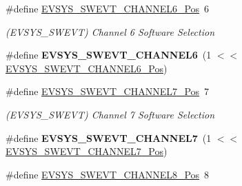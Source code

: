 \begin{DoxyCompactItemize}
\item 
\hypertarget{group___s_a_m_l21___e_v_s_y_s_ga923930945122e66f2e3a5734f2a1a4b7}{}\#define \hyperlink{group___s_a_m_l21___e_v_s_y_s_ga923930945122e66f2e3a5734f2a1a4b7}{E\+V\+S\+Y\+S\+\_\+\+S\+W\+E\+V\+T\+\_\+\+C\+H\+A\+N\+N\+E\+L6\+\_\+\+Pos}~6\label{group___s_a_m_l21___e_v_s_y_s_ga923930945122e66f2e3a5734f2a1a4b7}

\begin{DoxyCompactList}\small\item\em (E\+V\+S\+Y\+S\+\_\+\+S\+W\+E\+V\+T) Channel 6 Software Selection \end{DoxyCompactList}\item 
\hypertarget{group___s_a_m_l21___e_v_s_y_s_ga1cc70342b9a68bf2a9aaa671c36eea9c}{}\#define {\bfseries E\+V\+S\+Y\+S\+\_\+\+S\+W\+E\+V\+T\+\_\+\+C\+H\+A\+N\+N\+E\+L6}~(1 $<$$<$ \hyperlink{group___s_a_m_l21___e_v_s_y_s_ga923930945122e66f2e3a5734f2a1a4b7}{E\+V\+S\+Y\+S\+\_\+\+S\+W\+E\+V\+T\+\_\+\+C\+H\+A\+N\+N\+E\+L6\+\_\+\+Pos})\label{group___s_a_m_l21___e_v_s_y_s_ga1cc70342b9a68bf2a9aaa671c36eea9c}

\item 
\hypertarget{group___s_a_m_l21___e_v_s_y_s_ga4618f702d0e3ee1f6b10198b9acbf9af}{}\#define \hyperlink{group___s_a_m_l21___e_v_s_y_s_ga4618f702d0e3ee1f6b10198b9acbf9af}{E\+V\+S\+Y\+S\+\_\+\+S\+W\+E\+V\+T\+\_\+\+C\+H\+A\+N\+N\+E\+L7\+\_\+\+Pos}~7\label{group___s_a_m_l21___e_v_s_y_s_ga4618f702d0e3ee1f6b10198b9acbf9af}

\begin{DoxyCompactList}\small\item\em (E\+V\+S\+Y\+S\+\_\+\+S\+W\+E\+V\+T) Channel 7 Software Selection \end{DoxyCompactList}\item 
\hypertarget{group___s_a_m_l21___e_v_s_y_s_ga4b8e4ca4d7fd207d9140927a25f13bfa}{}\#define {\bfseries E\+V\+S\+Y\+S\+\_\+\+S\+W\+E\+V\+T\+\_\+\+C\+H\+A\+N\+N\+E\+L7}~(1 $<$$<$ \hyperlink{group___s_a_m_l21___e_v_s_y_s_ga4618f702d0e3ee1f6b10198b9acbf9af}{E\+V\+S\+Y\+S\+\_\+\+S\+W\+E\+V\+T\+\_\+\+C\+H\+A\+N\+N\+E\+L7\+\_\+\+Pos})\label{group___s_a_m_l21___e_v_s_y_s_ga4b8e4ca4d7fd207d9140927a25f13bfa}

\item 
\hypertarget{group___s_a_m_l21___e_v_s_y_s_ga42bdadb5359ee8f5d6d534ad7f0bc431}{}\#define \hyperlink{group___s_a_m_l21___e_v_s_y_s_ga42bdadb5359ee8f5d6d534ad7f0bc431}{E\+V\+S\+Y\+S\+\_\+\+S\+W\+E\+V\+T\+\_\+\+C\+H\+A\+N\+N\+E\+L8\+\_\+\+Pos}~8\label{group___s_a_m_l21___e_v_s_y_s_ga42bdadb5359ee8f5d6d534ad7f0bc431}


\end{DoxyCompactItemize}
